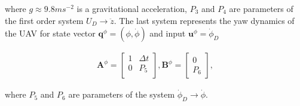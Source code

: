 where $g \approx 9.8 ms^{-2}$ is a gravitational acceleration, $P_3$ and $P_4$ are parameters of the first order system $U_D \rightarrow \ddot{z}$. The last system represents the yaw dynamics of the UAV for state vector $\mathbf{q}^{\phi} = \left(\phi, \dot{\phi}\right)$ and input $\mathbf{u}^\phi = \dot{\phi}_D$

\begin{equation}
\begin{split}
\mathbf{A}^{\phi} = \begin{bmatrix}
1 & \Delta t\\
0 & P_5 \\
\end{bmatrix}, \mathbf{B}^{\phi} = \begin{bmatrix}
0\\
P_6
\end{bmatrix},
\end{split}
\end{equation}

where $P_5$ and $P_6$ are parameters of the system $\dot{\phi}_D \rightarrow \dot{\phi}$.